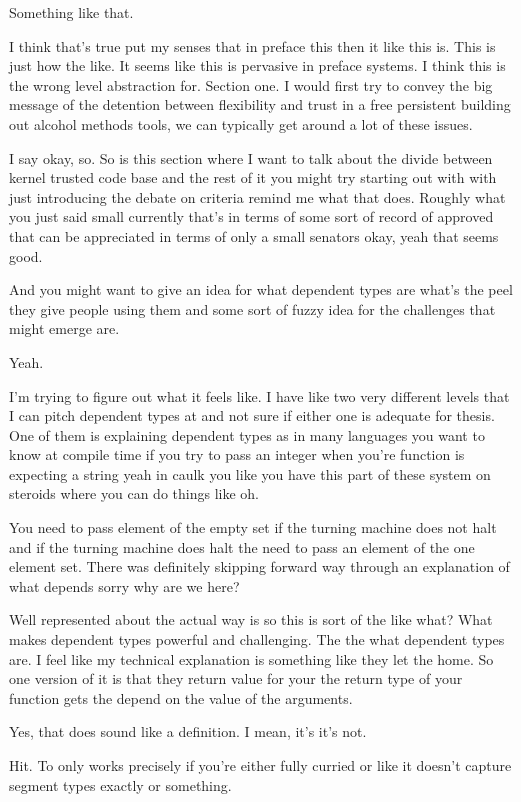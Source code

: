 \begin{subappendices}
Something like that. 

I think that's true put my senses that in preface this then it like this is. This is just how the like. It seems like this is pervasive in preface systems. I think this is the wrong level abstraction for. Section one. I would first try to convey the big message of the detention between flexibility and trust in a free persistent building out alcohol methods tools, we can typically get around a lot of these issues. 

I say okay, so. So is this section where I want to talk about the divide between kernel trusted code base and the rest of it you might try starting out with with just introducing the debate on criteria remind me what that does. Roughly what you just said small currently that's in terms of some sort of record of approved that can be appreciated in terms of only a small senators okay, yeah that seems good. 

And you might want to give an idea for what dependent types are what's the peel they give people using them and some sort of fuzzy idea for the challenges that might emerge are. 

Yeah. 

I'm trying to figure out what it feels like. I have like two very different levels that I can pitch dependent types at and not sure if either one is adequate for thesis. One of them is explaining dependent types as in many languages you want to know at compile time if you try to pass an integer when you're function is expecting a string yeah in caulk you like you have this part of these system on steroids where you can do things like oh. 

You need to pass element of the empty set if the turning machine does not halt and if the turning machine does halt the need to pass an element of the one element set. There was definitely skipping forward way through an explanation of what depends sorry why are we here? 

Well represented about the actual way is so this is sort of the like what? What makes dependent types powerful and challenging. The the what dependent types are. I feel like my technical explanation is something like they let the home. So one version of it is that they return value for your the return type of your function gets the depend on the value of the arguments. 

Yes, that does sound like a definition. I mean, it's it's not. 

Hit. To only works precisely if you're either fully curried or like it doesn't capture segment types exactly or something. 


\end{subappendices}
